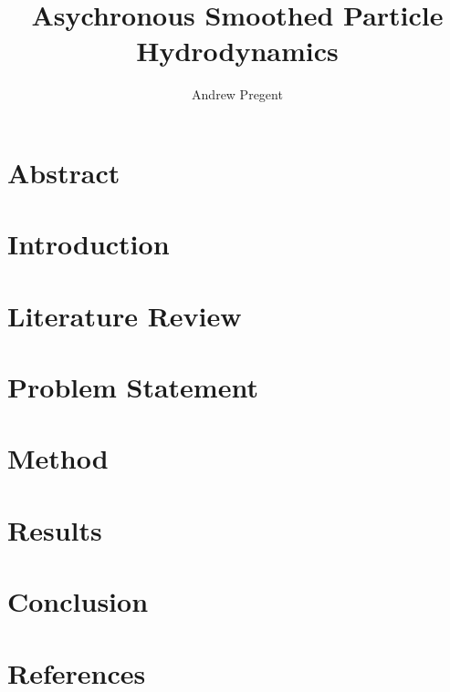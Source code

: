 \title{Asychronous Smoothed Particle Hydrodynamics}
\author{Andrew Pregent}
\date{}


\maketitle{}
\section{Abstract}
\section{Introduction}
\section{Literature Review}
\section{Problem Statement}
\section{Method}
\section{Results}
\section{Conclusion}
\section{References}
